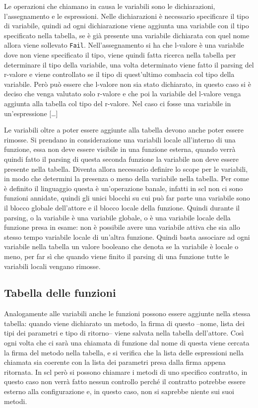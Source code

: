 \documentclass[]{article}
\begin{document}
Le operazioni che chiamano in causa le variabili sono le dichiarazioni,
l'assegnamento e le espressioni. Nelle dichiarazioni è necessario
specificare il tipo di variabile, quindi ad ogni dichiarazione viene
aggiunta una variabile con il tipo specificato nella tabella, se è già
presente una variabile dichiarata con quel nome allora viene sollevato
\texttt{Fail}. Nell'assegnamento si ha che l-valore è una variabile dove
non viene specificato il tipo, viene quindi fatta ricerca nella tabella
per determinare il tipo della variabile, una volta determinato viene
fatto il parsing del r-valore e viene controllato se il tipo di
quest'ultimo combacia col tipo della variabile. Però può essere che
l-valore non sia stato dichiarato, in questo caso si è deciso che venga
valutato solo r-valore e che poi la variabile del l-valore venga
aggiunta alla tabella col tipo del r-valore. Nel caso ci fosse una
variabile in un'espressione {[}\ldots{}{]}

Le variabili oltre a poter essere aggiunte alla tabella devono anche
poter essere rimosse. Si prendano in considerazione una variabili locale
all'interno di una funzione, essa non deve essere visibile in una
funzione esterna, quando verrà quindi fatto il parsing di questa seconda
funzione la variabile non deve essere presente nella tabella. Diventa
allora necessario definire lo scope per le variabili, in modo che
determini la presenza o meno della variabile nella tabella. Per come è
definito il linguaggio questa è un'operazione banale, infatti in scl non
ci sono funzioni annidate, quindi gli unici blocchi su cui può far parte
una variabile sono il blocco globale dell'attore e il blocco locale
della funzione. Quindi durante il parsing, o la variabile è una
variabile globale, o è una variabile locale della funzione presa in
esame: non è possibile avere una variabile attiva che sia allo stesso
tempo variabile locale di un'altra funzione. Quindi basta associare ad
ogni variabile nella tabella un valore booleano che denota se la
variabile è locale o meno, per far sì che quando viene finito il parsing
di una funzione tutte le variabili locali vengano rimosse.

\hypertarget{tabella-delle-funzioni}{%
\subsection{Tabella delle funzioni}\label{tabella-delle-funzioni}}

Analogamente alle variabili anche le funzioni possono essere aggiunte
nella stessa tabella: quando viene dichiarato un metodo, la firma di
questo --nome, lista dei tipi dei parametri e tipo di ritorno-- viene
salvata nella tabella dell'attore. Così ogni volta che ci sarà una
chiamata di funzione dal nome di questa viene cercata la firma del
metodo nella tabella, e si verifica che la lista delle espressioni nella
chiamata sia coerente con la lista dei parametri presa dalla firma
appena ritornata. In scl però si possono chiamare i metodi di uno
specifico contratto, in questo caso non verrà fatto nessun controllo
perché il contratto potrebbe essere esterno alla configurazione e, in
questo caso, non si saprebbe niente sui suoi metodi.
\end{document}
